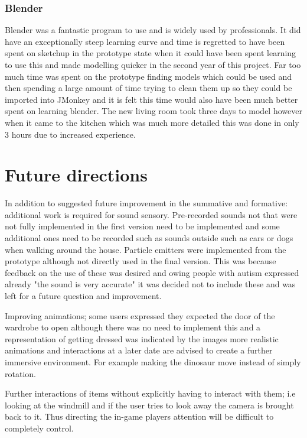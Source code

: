 \documentclass[11pt]{report}
\begin{document}
\subsubsection{Blender}
Blender was a fantastic program to use and is widely used by professionals. It did have an exceptionally steep learning curve and time is regretted to have been spent on sketchup in the prototype state when it could have been spent learning to use this and made modelling quicker in the second year of this project. Far too much time was spent on the prototype finding models which could be used and then spending a large amount of time trying to clean them up so they could be imported into JMonkey and it is felt this time would also have been much better spent on learning blender. The new living room took three days to model however when it came to the kitchen which was much more detailed this was done in only 3 hours due to increased experience.

\section{Future directions}
In addition to suggested future improvement in the summative and formative: additional work is required for sound sensory. Pre-recorded sounds not that were not fully implemented in the first version need to be implemented and some additional ones need to be recorded such as sounds outside such as cars or dogs when walking around the house. Particle emitters were implemented from the prototype although not directly used in the final version. This was because feedback on the use of these was desired and owing people with autism expressed already "the sound is very accurate" it was decided not to include these and was left for a future question and improvement. 

Improving animations; some users expressed they expected the door of the wardrobe to open although there was no need to implement this and a representation of getting dressed was indicated by the images more realistic animations and interactions at a later date are advised to create a further immersive environment. For example making the dinosaur move instead of simply rotation. 

Further interactions of items without explicitly having to interact with them; i.e looking at the windmill and if the user tries to look away the camera is brought back to it. Thus directing the in-game players attention will be difficult to completely control.  
\end{document}
